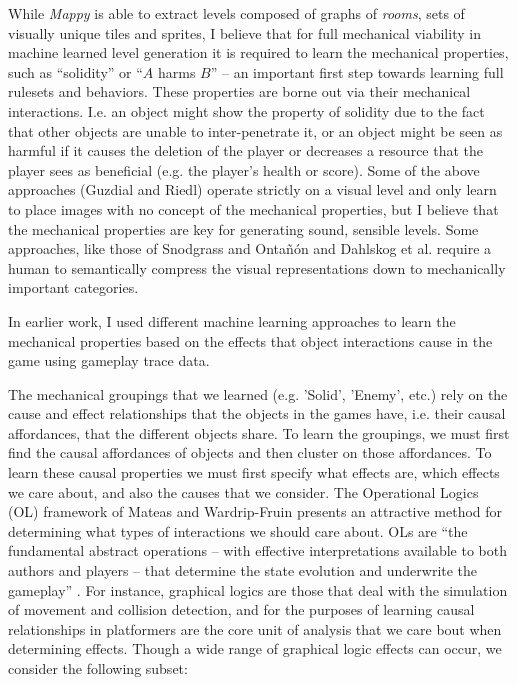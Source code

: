 \documentclass[12pt]{report}
\begin{document}
While \textit{Mappy} is able to extract levels composed of graphs of \textit{rooms}, sets of visually unique tiles and sprites, I believe that for full mechanical viability in machine learned level generation it is required to learn the mechanical properties, such as ``solidity'' or ``$A$ harms $B$'' -- an important first step towards learning full rulesets and behaviors. These properties are borne out via their mechanical interactions.  I.e. an object might show the property of solidity due to the fact that other objects are unable to inter-penetrate it, or an object might be seen as harmful if it causes the deletion of the player or decreases a resource that the player sees as beneficial (e.g. the player's health or score).  Some of the above approaches (Guzdial and Riedl) operate strictly on a visual level and only learn to place images with no concept of the mechanical properties, but I believe that the mechanical properties are key for generating sound, sensible levels.  Some approaches, like those of Snodgrass and Onta{\~n}{\'o}n and Dahlskog et al. require a human to semantically compress the visual representations down to mechanically important categories.  

In earlier work, I used different machine learning approaches to  learn the mechanical properties based on the effects that object interactions cause in the game using gameplay trace data. 

 The mechanical groupings that we learned (e.g. 'Solid', 'Enemy', etc.) rely on the cause and effect relationships that the objects in the games have, i.e. their causal affordances, that the different objects share.  To learn the groupings, we must first find the causal affordances of objects and then cluster on those affordances.  To learn these causal properties we must first specify what effects are, which effects we care about, and also the causes that we consider.  The Operational Logics (OL) framework of Mateas and Wardrip-Fruin \cite{OperationalLogics} presents an attractive method for determining what types of interactions we should care about.  OLs are ``the fundamental abstract operations -- with effective interpretations available to both authors and players -- that determine the state evolution and underwrite the gameplay'' \cite{OperationalLogics}.  For instance, graphical logics are those that deal with the simulation of movement and collision detection, and for the purposes of learning causal relationships in platformers are the core unit of analysis that we care bout when determining effects. Though a wide range of graphical logic effects can occur, we consider the following subset:
 
\end{document}
